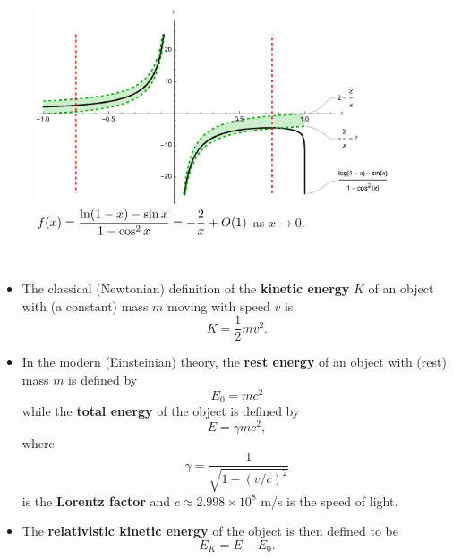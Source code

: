 \begin{figure}[H]
\includegraphics[width=6.5in]{img/power_series_and_limits2}
\caption{$f(x) =\displaystyle\frac{\ln(1-x)-\sin x}{1-\cos^2 x} = -\frac{2}{x} + O(1)$ as $x\to 0$.}
\end{figure}

\newpage

\begin{remark}\,
\begin{itemize}
\item The classical (Newtonian) definition of the \textbf{kinetic energy} $K$ of an object with (a constant) mass $m$ moving with speed $v$ is
\begin{equation*}
K= \frac{1}{2}mv^2.
\end{equation*}
\item In the modern (Einsteinian) theory, the \textbf{rest energy} of an object with (rest) mass $m$ is defined by
\begin{equation*}
E_0 = mc^2
\end{equation*}
while the \textbf{total energy} of the object is defined by
\begin{equation*}
E = \gamma mc^2,
\end{equation*}
where
\begin{equation*}
\gamma = \frac{1}{\sqrt{1-(v/c)^2}}
\end{equation*}
is the \textbf{Lorentz factor}
and $c\approx 2.998\times 10^8$ \si{m/s} is the speed of light.
\item The \textbf{relativistic kinetic energy} of the object is then defined to be
\begin{equation*}
E_K = E-E_0.
\end{equation*}
\end{itemize}
\end{remark}

